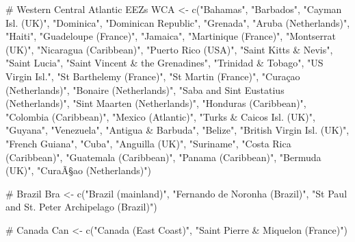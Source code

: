 \documentclass[
  letterpaper,
  oneside,
  open=any]{scrbook}
\newenvironment{Shaded}{\begin{snugshade}}{\end{snugshade}}
\newcommand{\CommentTok}[1]{\textcolor[rgb]{0.37,0.37,0.37}{#1}}
\newcommand{\FunctionTok}[1]{\textcolor[rgb]{0.28,0.35,0.67}{#1}}
\newcommand{\NormalTok}[1]{\textcolor[rgb]{0.00,0.23,0.31}{#1}}
\newcommand{\OtherTok}[1]{\textcolor[rgb]{0.00,0.23,0.31}{#1}}
\newcommand{\StringTok}[1]{\textcolor[rgb]{0.13,0.47,0.30}{#1}}
\begin{document}
\begin{Shaded}
\begin{Highlighting}[]
\CommentTok{\# Western Central Atlantic EEZs}
\NormalTok{WCA }\OtherTok{\textless{}{-}} \FunctionTok{c}\NormalTok{(}\StringTok{"Bahamas"}\NormalTok{, }\StringTok{"Barbados"}\NormalTok{, }\StringTok{"Cayman Isl. (UK)"}\NormalTok{, }\StringTok{"Dominica"}\NormalTok{, }\StringTok{"Dominican Republic"}\NormalTok{, }\StringTok{"Grenada"}\NormalTok{, }
         \StringTok{"Aruba (Netherlands)"}\NormalTok{, }\StringTok{"Haiti"}\NormalTok{, }\StringTok{"Guadeloupe  (France)"}\NormalTok{, }\StringTok{"Jamaica"}\NormalTok{, }\StringTok{"Martinique (France)"}\NormalTok{,}
         \StringTok{"Montserrat (UK)"}\NormalTok{, }\StringTok{"Nicaragua (Caribbean)"}\NormalTok{, }\StringTok{"Puerto Rico (USA)"}\NormalTok{, }\StringTok{"Saint Kitts \& Nevis"}\NormalTok{, }
         \StringTok{"Saint Lucia"}\NormalTok{, }\StringTok{"Saint Vincent \& the Grenadines"}\NormalTok{, }\StringTok{"Trinidad \& Tobago"}\NormalTok{, }\StringTok{"US Virgin Isl."}\NormalTok{, }
         \StringTok{"St Barthelemy (France)"}\NormalTok{, }\StringTok{"St Martin (France)"}\NormalTok{, }\StringTok{"Curaçao (Netherlands)"}\NormalTok{, }\StringTok{"Bonaire (Netherlands)"}\NormalTok{,}
         \StringTok{"Saba and Sint Eustatius (Netherlands)"}\NormalTok{, }\StringTok{"Sint Maarten (Netherlands)"}\NormalTok{, }\StringTok{"Honduras (Caribbean)"}\NormalTok{,}
         \StringTok{"Colombia (Caribbean)"}\NormalTok{, }\StringTok{"Mexico (Atlantic)"}\NormalTok{, }\StringTok{"Turks \& Caicos Isl. (UK)"}\NormalTok{, }\StringTok{"Guyana"}\NormalTok{, }\StringTok{"Venezuela"}\NormalTok{,}
         \StringTok{"Antigua \& Barbuda"}\NormalTok{, }\StringTok{"Belize"}\NormalTok{, }\StringTok{"British Virgin Isl. (UK)"}\NormalTok{, }\StringTok{"French Guiana"}\NormalTok{, }\StringTok{"Cuba"}\NormalTok{, }
         \StringTok{"Anguilla (UK)"}\NormalTok{, }\StringTok{"Suriname"}\NormalTok{, }\StringTok{"Costa Rica (Caribbean)"}\NormalTok{, }\StringTok{"Guatemala (Caribbean)"}\NormalTok{, }
         \StringTok{"Panama (Caribbean)"}\NormalTok{, }\StringTok{"Bermuda (UK)"}\NormalTok{, }\StringTok{"CuraÃ§ao (Netherlands)"}\NormalTok{) }
           
\CommentTok{\# Brazil}
\NormalTok{Bra }\OtherTok{\textless{}{-}} \FunctionTok{c}\NormalTok{(}\StringTok{"Brazil (mainland)"}\NormalTok{, }\StringTok{"Fernando de Noronha (Brazil)"}\NormalTok{, }
         \StringTok{"St Paul and St. Peter Archipelago (Brazil)"}\NormalTok{)}

\CommentTok{\# Canada}
\NormalTok{Can }\OtherTok{\textless{}{-}}  \FunctionTok{c}\NormalTok{(}\StringTok{"Canada (East Coast)"}\NormalTok{, }\StringTok{"Saint Pierre \& Miquelon (France)"}\NormalTok{)}


\end{Highlighting}
\end{Shaded}
\end{document}
